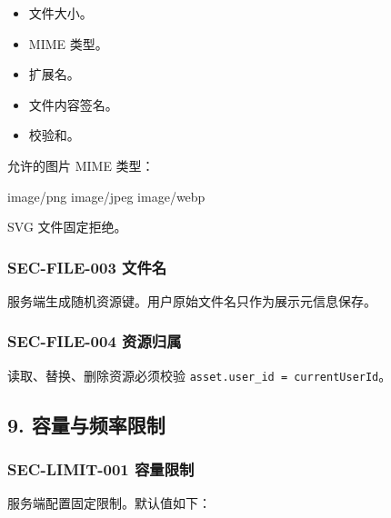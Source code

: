 \documentclass[
  a4paper,
  UTF8]{ctexart}
\newenvironment{Shaded}{}{}
\newcommand{\NormalTok}[1]{#1}
\providecommand{\tightlist}{%
  \setlength{\itemsep}{0pt}\setlength{\parskip}{0pt}}
\begin{document}
\begin{itemize}
\tightlist
\item
  文件大小。
\item
  MIME 类型。
\item
  扩展名。
\item
  文件内容签名。
\item
  校验和。
\end{itemize}

允许的图片 MIME 类型：

\begin{Shaded}
\begin{Highlighting}[]
\NormalTok{image/png}
\NormalTok{image/jpeg}
\NormalTok{image/webp}
\end{Highlighting}
\end{Shaded}

SVG 文件固定拒绝。

\hypertarget{sec-file-003-ux6587ux4ef6ux540d}{%
\subsubsection{SEC-FILE-003
文件名}\label{sec-file-003-ux6587ux4ef6ux540d}}

服务端生成随机资源键。用户原始文件名只作为展示元信息保存。

\hypertarget{sec-file-004-ux8d44ux6e90ux5f52ux5c5e}{%
\subsubsection{SEC-FILE-004
资源归属}\label{sec-file-004-ux8d44ux6e90ux5f52ux5c5e}}

读取、替换、删除资源必须校验 \texttt{asset.user\_id\ =\ currentUserId}。

\hypertarget{ux5bb9ux91cfux4e0eux9891ux7387ux9650ux5236}{%
\subsection{9.
容量与频率限制}\label{ux5bb9ux91cfux4e0eux9891ux7387ux9650ux5236}}

\hypertarget{sec-limit-001-ux5bb9ux91cfux9650ux5236}{%
\subsubsection{SEC-LIMIT-001
容量限制}\label{sec-limit-001-ux5bb9ux91cfux9650ux5236}}

服务端配置固定限制。默认值如下：
\end{document}
